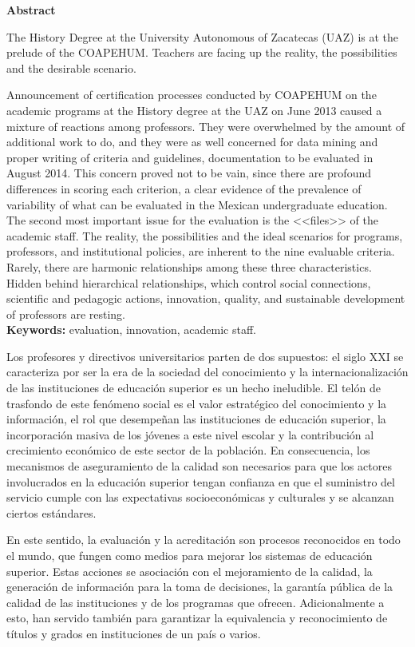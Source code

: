 \bigskip
\textbf{Abstract}

\begin{sloppypar}
The History Degree at the University
Autonomous of Zacatecas (UAZ) is at the prelude of the COAPEHUM. Teachers
are facing up the reality, the possibilities and the desirable scenario.
\end{sloppypar}

{Announcement of certification processes conducted by COAPEHUM on the
academic programs at the History degree at the UAZ on June 2013 caused a
mixture of reactions among professors. They were overwhelmed by the amount
of additional work to do, and they were as well concerned for data mining
and proper writing of criteria and guidelines, documentation to be
evaluated in August 2014. This concern proved not to be vain, since there
are profound differences in scoring each criterion, a clear evidence of the
prevalence of variability of what can be evaluated in the Mexican
undergraduate education. The second most important issue for the evaluation
is the <<files>> of the academic staff. The reality, the possibilities and
the ideal scenarios for programs, professors, and institutional policies,
are inherent to the nine evaluable criteria. Rarely, there are harmonic
relationships among these three characteristics. Hidden behind hierarchical
relationships, which control social connections, scientific and pedagogic
actions, innovation, quality, and sustainable development of professors are
resting.\\
{\bfseries Keywords:} evaluation, innovation, academic staff.

\bigskip
Los profesores y directivos universitarios parten de dos supuestos: el 
siglo XXI se caracteriza por ser la era de la sociedad del conocimiento y 
la internacionalización de las instituciones de educación superior  es un
hecho ineludible. El telón de trasfondo de este fenómeno social es el valor
estratégico del conocimiento y la información, el rol que desempeñan las
instituciones de educación superior, la incorporación  masiva de los
jóvenes a este nivel escolar y la contribución al crecimiento económico de
este sector de la población. En consecuencia, los mecanismos de
aseguramiento de la calidad son necesarios para que los actores
involucrados en la educación superior tengan confianza en que el suministro
del servicio cumple con las expectativas socioeconómicas y culturales y se
alcanzan ciertos estándares.


En este sentido, la evaluación y la acreditación son procesos reconocidos en
todo el mundo, que fungen como medios para mejorar los sistemas de
educación superior. Estas acciones se asociación con el mejoramiento de la
calidad, la generación de información para la toma de decisiones, la
garantía pública de la calidad de las instituciones y de los programas que
ofrecen. Adicionalmente a esto, han servido también para garantizar la
equivalencia y reconocimiento de títulos y grados en instituciones de un
país o varios. 

}
